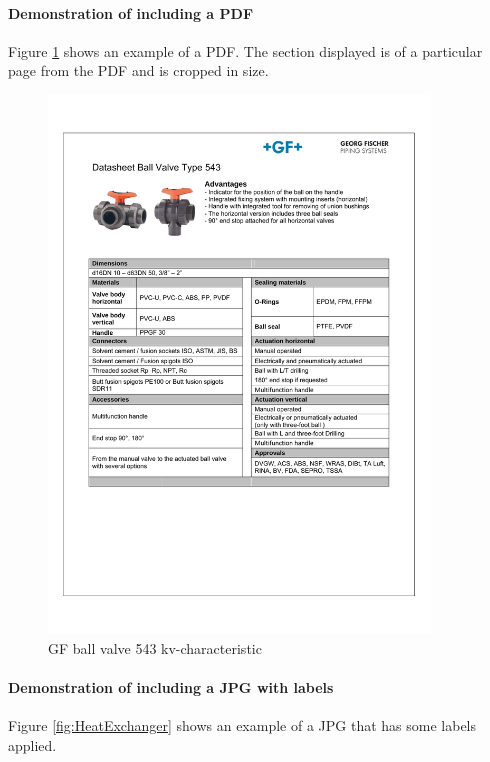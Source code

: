 \paragraph{Demonstration of including a PDF}
Figure \ref{fig:GF543kv} shows an example of a PDF. The section displayed is of a particular page from the PDF and is cropped in size.
\begin{figure}
	\centering
	\includegraphics[width=0.9\textwidth,page=6, trim = 25mm 172mm 25mm 45mm, clip]{600-Appendices/Datasheet_GF_543}
	\caption{GF ball valve 543 kv-characteristic}
	\label{fig:GF543kv}
\end{figure}

\paragraph{Demonstration of including a JPG with labels}
Figure \ref{fig:HeatExchanger} shows an example of a JPG that has some labels applied.

